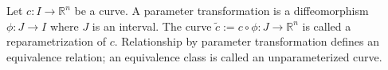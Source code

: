 Let $c: I \to \mathbb{R}^n$ be a curve. A parameter transformation is a diffeomorphism $\phi: J \to I$ where $J$ is an interval. The curve $\tilde{c} := c \circ \phi: J \to \mathbb{R}^n$ is called a reparametrization of $c$. Relationship by parameter transformation defines an equivalence relation; an equivalence class is called an unparameterized curve.